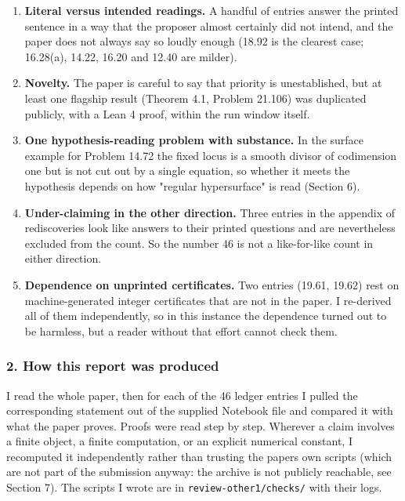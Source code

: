 \begin{enumerate}
\def\labelenumi{\arabic{enumi}.}
\tightlist
\item
  \textbf{Literal versus intended readings.} A handful of entries answer
  the printed sentence in a way that the proposer almost certainly did
  not intend, and the paper does not always say so loudly enough (18.92
  is the clearest case; 16.28(a), 14.22, 16.20 and 12.40 are milder).
\item
  \textbf{Novelty.} The paper is careful to say that priority is
  unestablished, but at least one flagship result (Theorem 4.1, Problem
  21.106) was duplicated publicly, with a Lean 4 proof, within the run
  window itself.
\item
  \textbf{One hypothesis-reading problem with substance.} In the surface
  example for Problem 14.72 the fixed locus is a smooth divisor of
  codimension one but is not cut out by a single equation, so whether it
  meets the hypothesis depends on how "regular hypersurface" is read
  (Section 6).
\item
  \textbf{Under-claiming in the other direction.} Three entries in the
  appendix of rediscoveries look like answers to their printed questions
  and are nevertheless excluded from the count. So the number 46 is not
  a like-for-like count in either direction.
\item
  \textbf{Dependence on unprinted certificates.} Two entries (19.61,
  19.62) rest on machine-generated integer certificates that are not in
  the paper. I re-derived all of them independently, so in this instance
  the dependence turned out to be harmless, but a reader without that
  effort cannot check them.
\end{enumerate}

\hypertarget{review-md-how-this-report-was-produced}{%
\subsubsection*{2. How this report was
produced}\label{review-md-how-this-report-was-produced}}

I read the whole paper, then for each of the 46 ledger entries I pulled
the corresponding statement out of the supplied Notebook file and
compared it with what the paper proves. Proofs were read step by step.
Wherever a claim involves a finite object, a finite computation, or an
explicit numerical constant, I recomputed it independently rather than
trusting the paper\textquotesingle s own scripts (which are not part of
the submission anyway: the archive is not publicly reachable, see
Section 7). The scripts I wrote are in \nolinkurl{review-other1/checks/}
with their logs.


